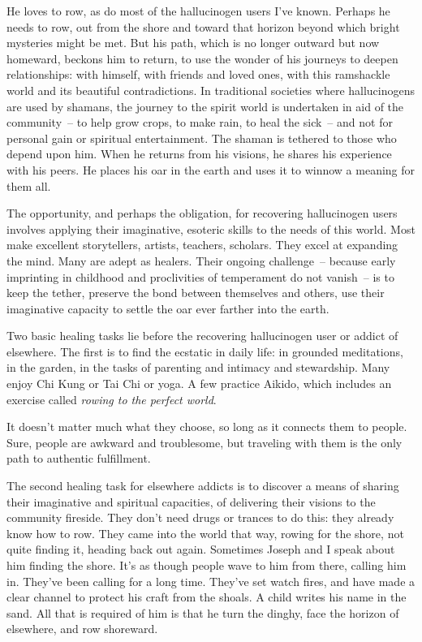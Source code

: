 \documentclass[10pt,DIV09,letterpaper,oneside,headsepline]{scrreprt}
\begin{document}
He loves to row, as do most of the hallucinogen users I've known. Perhaps he needs to row, out from the shore and toward that horizon beyond which bright mysteries might be met. But his path, which is no longer outward but now homeward, beckons him to return, to use the wonder of his journeys to deepen relationships: with himself, with friends and loved ones, with this ramshackle world and its beautiful contradictions. In traditional societies where hallucinogens are used by shamans, the journey to the spirit world is undertaken in aid of the community~-- to help grow crops, to make rain, to heal the sick~-- and not for personal gain or spiritual entertainment. The shaman is tethered to those who depend upon him. When he returns from his visions, he shares his experience with his peers. He places his oar in the earth and uses it to winnow a meaning for them all.

The opportunity, and perhaps the obligation, for recovering hallucinogen users involves applying their imaginative, esoteric skills to the needs of this world. Most make excellent storytellers, artists, teachers, scholars. They excel at expanding the mind. Many are adept as healers. Their ongoing challenge~-- because early imprinting in childhood and proclivities of temperament do not vanish~-- is to keep the tether, preserve the bond between themselves and others, use their imaginative capacity to settle the oar ever farther into the earth.

Two basic healing tasks lie before the recovering hallucinogen user or addict of elsewhere. The first is to find the ecstatic in daily life: in grounded meditations, in the garden, in the tasks of parenting and intimacy and stewardship. Many enjoy Chi Kung or Tai Chi or yoga. A few practice Aikido, which includes an exercise called \textit{rowing to the perfect world}.

It doesn't matter much what they choose, so long as it connects them to people. Sure, people are awkward and troublesome, but traveling with them is the only path to authentic fulfillment.

The second healing task for elsewhere addicts is to discover a means of sharing their imaginative and spiritual capacities, of delivering their visions to the community fireside. They don't need drugs or trances to do this: they already know how to row. They came into the world that way, rowing for the shore, not quite finding it, heading back out again. Sometimes Joseph and I speak about him finding the shore. It's as though people wave to him from there, calling him in. They've been calling for a long time. They've set watch fires, and have made a clear channel to protect his craft from the shoals. A child writes his name in the sand. All that is required of him is that he turn the dinghy, face the horizon of elsewhere, and row shoreward.
\end{document}
